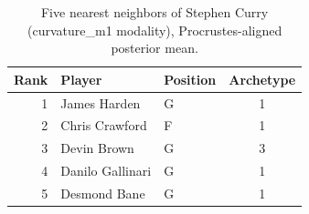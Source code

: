 \begin{table}[htbp]
  \centering\small
  \begin{tabular}{rllc}
    \toprule
    Rank & Player & Position & Archetype \\
    \midrule
    1 & James Harden & G & 1 \\
    2 & Chris Crawford & F & 1 \\
    3 & Devin Brown & G & 3 \\
    4 & Danilo Gallinari & G & 1 \\
    5 & Desmond Bane & G & 1 \\
    \bottomrule
  \end{tabular}
  \caption{Five nearest neighbors of Stephen Curry (curvature_m1 modality), Procrustes-aligned posterior mean.}
  \label{tab:Stephen_Curry_neighbors_curvature_m1}
\end{table}

